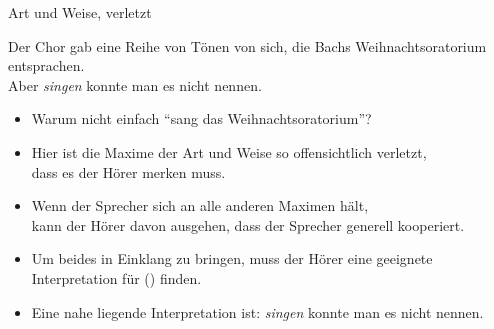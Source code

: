 \begin{frame}{Art und Weise, verletzt}

\begin{exe}
\ex Der Chor gab eine Reihe von Tönen von sich, die Bachs Weihnachtsoratorium entsprachen.\\
       \alert{Aber \textit{singen} konnte man es nicht nennen.}
\end{exe}

\begin{itemize}
\item Warum nicht einfach "`sang das Weihnachtsoratorium"'?\pause
\item Hier ist die Maxime der Art und Weise so offensichtlich verletzt,\\ dass es der Hörer merken muss.\pause
\item Wenn der Sprecher sich an alle anderen Maximen hält,\\ kann der Hörer davon ausgehen, dass der Sprecher generell kooperiert.\pause
\item Um beides in Einklang zu bringen, muss der Hörer eine geeignete  Interpretation für () finden.\pause
\item Eine nahe liegende Interpretation ist: \textit{singen} konnte man es nicht nennen.
\end{itemize}
\end{frame}

